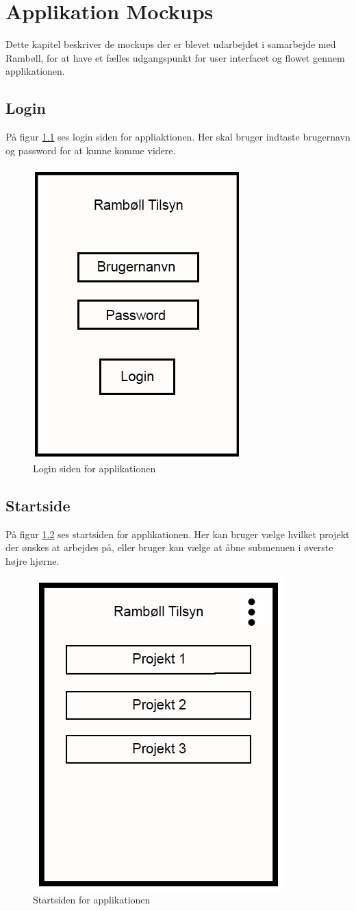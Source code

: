 \chapter{Applikation Mockups}
Dette kapitel beskriver de mockups der er blevet udarbejdet i samarbejde med Rambøll, for at have et fælles udgangspunkt for user interfacet og flowet gennem applikationen. \\

\section{Login}\label{sec:LoginMock}
På figur \ref{fig:LoginMock} ses login siden for appliaktionen. Her skal bruger indtaste brugernavn og password for at kunne komme videre.
\begin{figure}[H]
	\centering
	\includegraphics[width=0.4\linewidth]{MockUps/Mock/Ramboell-Login}
	\caption{Login siden for applikationen}
	\label{fig:LoginMock}
\end{figure}

\clearpage

\section{Startside}\label{sec:StartMock}
På figur \ref{fig:StartMock} ses startsiden for applikationen. Her kan bruger vælge hvilket projekt der ønskes at arbejdes på, eller bruger kan vælge at åbne submenuen i øverste højre hjørne.
\begin{figure}[H]
	\centering
	\includegraphics[width=0.4\linewidth]{MockUps/Mock/Ramboell-Startside}
	\caption{Startsiden for applikationen}
	\label{fig:StartMock}
\end{figure}

